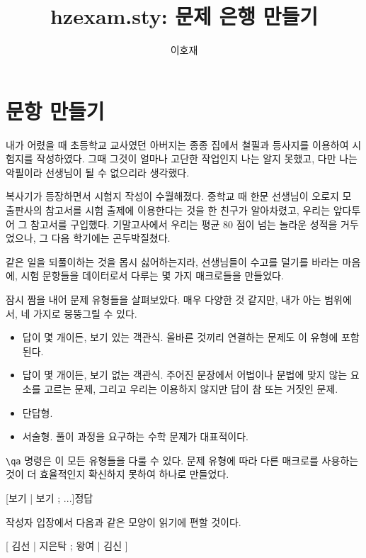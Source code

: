 \documentclass[a4paper]{oblivoir}
\title{hzexam.sty: 문제 은행 만들기}
\author{이호재}
\begin{document}
\maketitle

\section{문항 만들기}

내가 어렸을 때 초등학교 교사였던 아버지는 종종 집에서 철필과 등사지를 이용하여 시험지를 작성하였다. 그때 그것이 얼마나 고단한 작업인지 나는 알지 못했고, 다만 나는 악필이라 선생님이 될 수 없으리라 생각했다.

복사기가 등장하면서 시험지 작성이 수월해졌다. 
중학교 때 한문 선생님이 오로지 모 출판사의 참고서를 시험 출제에 이용한다는 것을 한 친구가 알아차렸고, 우리는 앞다투어 그 참고서를 구입했다.
기말고사에서 우리는 평균 80 점이 넘는 놀라운 성적을 거두었으나, 그 다음 학기에는 곤두박질쳤다.

같은 일을 되풀이하는 것을 몹시 싫어하는지라, 선생님들이 수고를 덜기를 바라는 마음에, 시험 문항들을 데이터로서 다루는 몇 가지 매크로들을 만들었다. 

잠시 짬을 내어 문제 유형들을 살펴보았다. 
매우 다양한 것 같지만, 내가 아는 범위에서, 네 가지로 뭉뚱그릴 수 있다.

\begin{itemize}
\item 답이 몇 개이든, 보기 있는 객관식. 올바른 것끼리 연결하는 문제도 이 유형에 포함된다.
\item 답이 몇 개이든, 보기 없는 객관식. 주어진 문장에서 어법이나 문법에 맞지 않는 요소를 고르는 문제, 그리고 우리는 이용하지 않지만 답이 참 또는 거짓인 문제.
\item 단답형.
\item 서술형. 풀이 과정을 요구하는 수학 문제가 대표적이다.
\end{itemize}

\verb|\qa| 명령은 이 모든 유형들을 다룰 수 있다.
문제 유형에 따라 다른 매크로를 사용하는 것이 더 효율적인지 확신하지 못하여 하나로 만들었다.

\begin{boxedverbatim}
[보기 | 보기 ; ...]{정답}
\end{boxedverbatim}

작성자 입장에서 다음과 같은 모양이 읽기에 편할 것이다.

\begin{boxedverbatim}
[ 
김선 | 
지은탁 ; 
왕여 | 
김신 
]{
}
\end{boxedverbatim}
\end{document}
